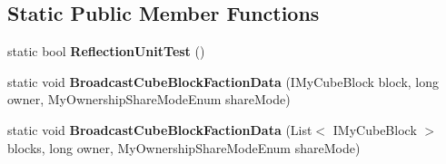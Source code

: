 \subsection*{Static Public Member Functions}
\begin{DoxyCompactItemize}
\item 
\hypertarget{class_s_e_mod_a_p_i_internal_1_1_a_p_i_1_1_entity_1_1_sector_1_1_sector_object_1_1_cube_grid_network_manager_ae19ce30bb2ccd0391cb573242f2f7859}{}static bool {\bfseries Reflection\+Unit\+Test} ()\label{class_s_e_mod_a_p_i_internal_1_1_a_p_i_1_1_entity_1_1_sector_1_1_sector_object_1_1_cube_grid_network_manager_ae19ce30bb2ccd0391cb573242f2f7859}

\item 
\hypertarget{class_s_e_mod_a_p_i_internal_1_1_a_p_i_1_1_entity_1_1_sector_1_1_sector_object_1_1_cube_grid_network_manager_a21168df04fe634becda2f82f44242a14}{}static void {\bfseries Broadcast\+Cube\+Block\+Faction\+Data} (I\+My\+Cube\+Block block, long owner, My\+Ownership\+Share\+Mode\+Enum share\+Mode)\label{class_s_e_mod_a_p_i_internal_1_1_a_p_i_1_1_entity_1_1_sector_1_1_sector_object_1_1_cube_grid_network_manager_a21168df04fe634becda2f82f44242a14}

\item 
\hypertarget{class_s_e_mod_a_p_i_internal_1_1_a_p_i_1_1_entity_1_1_sector_1_1_sector_object_1_1_cube_grid_network_manager_a359237297e15a98dd6075e3bf98fc42a}{}static void {\bfseries Broadcast\+Cube\+Block\+Faction\+Data} (List$<$ I\+My\+Cube\+Block $>$ blocks, long owner, My\+Ownership\+Share\+Mode\+Enum share\+Mode)\label{class_s_e_mod_a_p_i_internal_1_1_a_p_i_1_1_entity_1_1_sector_1_1_sector_object_1_1_cube_grid_network_manager_a359237297e15a98dd6075e3bf98fc42a}

\end{DoxyCompactItemize}
